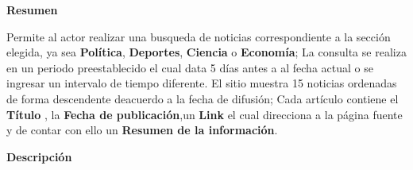 
\begin{large}
	\textbf{Resumen}\\
\end{large}

Permite al actor realizar una busqueda de noticias correspondiente a la sección elegida, ya sea \textbf{Política}, \textbf{Deportes}, \textbf{Ciencia} o \textbf{Economía}; La consulta se realiza en un periodo preestablecido el cual data 5 días antes a al fecha actual o se ingresar un intervalo de tiempo diferente. El sitio muestra 15 noticias ordenadas de forma descendente deacuerdo a la fecha de difusión; Cada artículo contiene el \textbf{Título} , la \textbf{Fecha de publicación},un \textbf{Link} el cual direcciona a la página fuente y de contar con ello  un \textbf{Resumen de la información}.\\

\begin{large}
	\textbf{Descripción}\\
\end{large}




